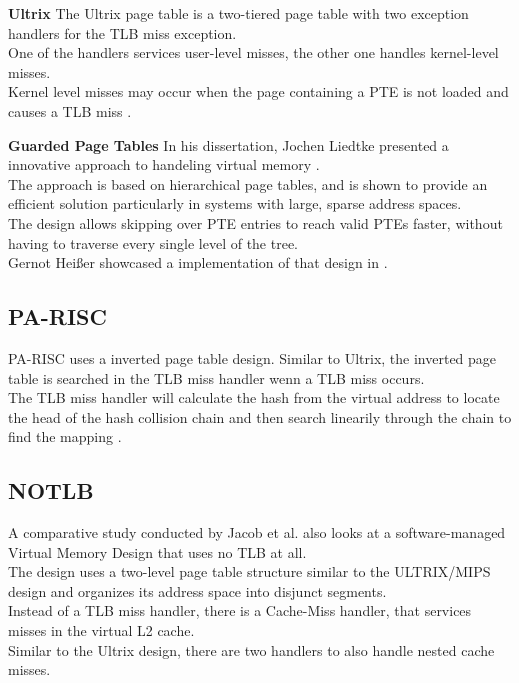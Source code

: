 \textbf{Ultrix} The Ultrix page table is a two-tiered page table with two exception handlers for the TLB miss exception.\\
One of the handlers services user-level misses, the other one handles kernel-level misses.\\
Kernel level misses may occur when the page containing a PTE is not loaded and causes a
TLB miss \cite{jacob1998look}.

\textbf{Guarded Page Tables} In his dissertation, Jochen Liedtke presented a innovative approach
to handeling virtual memory \cite{liedtkeGPT}.\\
The approach is based on hierarchical page tables, and is shown to provide an efficient solution particularly in systems with large, sparse address spaces.\\
The design allows skipping over PTE entries to reach valid PTEs faster, without having to traverse every single level of the tree.\\
Gernot Heißer showcased a implementation of that design in \cite{heiserAnatomyHighPerformanceMicrokernel}.

\subsection{PA-RISC}
PA-RISC uses a inverted page table design. Similar to Ultrix, the inverted page table is searched in the TLB miss handler wenn a TLB miss occurs.\\
The TLB miss handler will calculate the hash from the virtual address to locate the head of the hash collision chain and then search linearily through the chain to find the mapping \cite{jacob1998look}.

\subsection{NOTLB}
A comparative study conducted by Jacob et al. \cite{jacob1998look} also looks at a software-managed Virtual Memory Design that uses no TLB at all.\\
The design uses a two-level page table structure similar to the ULTRIX/MIPS design and organizes its address space into disjunct segments.\\
Instead of a TLB miss handler, there is a Cache-Miss handler, that services misses in the virtual L2 cache.\\
Similar to the Ultrix design, there are two handlers to also handle nested cache misses.


